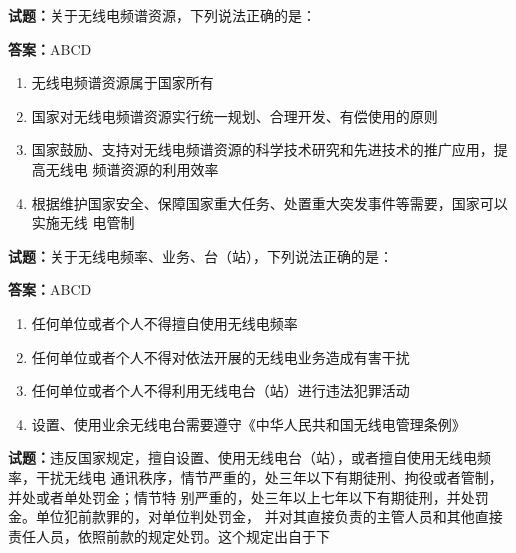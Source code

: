 \documentclass{ctexbook}
\begin{document}
\vspace{1em}

\textbf{试题：}关于无线电频谱资源，下列说法正确的是： 

\textbf{答案：}ABCD 

\begin{enumerate}[leftmargin=3em]
  \item 无线电频谱资源属于国家所有 

  \item 国家对无线电频谱资源实行统一规划、合理开发、有偿使用的原则 

  \item 国家鼓励、支持对无线电频谱资源的科学技术研究和先进技术的推广应用，提高无线电
频谱资源的利用效率 

  \item 根据维护国家安全、保障国家重大任务、处置重大突发事件等需要，国家可以实施无线
电管制 

\end{enumerate}





\vspace{1em}

\textbf{试题：}关于无线电频率、业务、台（站），下列说法正确的是： 

\textbf{答案：}ABCD 

\begin{enumerate}[leftmargin=3em]
  \item 任何单位或者个人不得擅自使用无线电频率 

  \item 任何单位或者个人不得对依法开展的无线电业务造成有害干扰 

  \item 任何单位或者个人不得利用无线电台（站）进行违法犯罪活动 

  \item 设置、使用业余无线电台需要遵守《中华人民共和国无线电管理条例》 

\end{enumerate}





\vspace{1em}

\textbf{试题：}违反国家规定，擅自设置、使用无线电台（站），或者擅自使用无线电频率，干扰无线电
通讯秩序，情节严重的，处三年以下有期徒刑、拘役或者管制，并处或者单处罚金；情节特
别严重的，处三年以上七年以下有期徒刑，并处罚金。单位犯前款罪的，对单位判处罚金，
并对其直接负责的主管人员和其他直接责任人员，依照前款的规定处罚。这个规定出自于下
\end{document}
